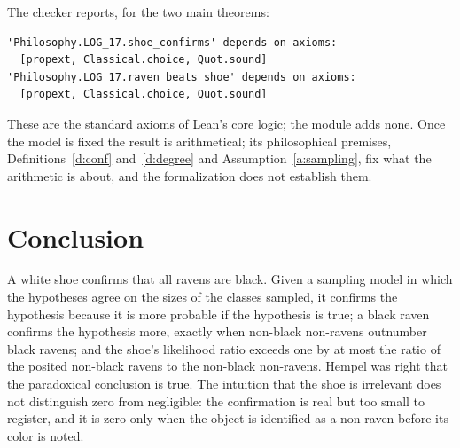 \documentclass{situationist-preprint}
\begin{document}
\noindent The checker reports, for the two main theorems:

\begin{lstlisting}
'Philosophy.LOG_17.shoe_confirms' depends on axioms:
  [propext, Classical.choice, Quot.sound]
'Philosophy.LOG_17.raven_beats_shoe' depends on axioms:
  [propext, Classical.choice, Quot.sound]
\end{lstlisting}

These are the standard axioms of Lean's core logic; the module adds none. Once the model is fixed the result is arithmetical; its philosophical premises, Definitions~\ref{d:conf} and~\ref{d:degree} and Assumption~\ref{a:sampling}, fix what the arithmetic is about, and the formalization does not establish them.

\section{Conclusion}

A white shoe confirms that all ravens are black. Given a sampling model in which the hypotheses agree on the sizes of the classes sampled, it confirms the hypothesis because it is more probable if the hypothesis is true; a black raven confirms the hypothesis more, exactly when non-black non-ravens outnumber black ravens; and the shoe's likelihood ratio exceeds one by at most the ratio of the posited non-black ravens to the non-black non-ravens. Hempel was right that the paradoxical conclusion is true. The intuition that the shoe is irrelevant does not distinguish zero from negligible: the confirmation is real but too small to register, and it is zero only when the object is identified as a non-raven before its color is noted.
\end{document}

